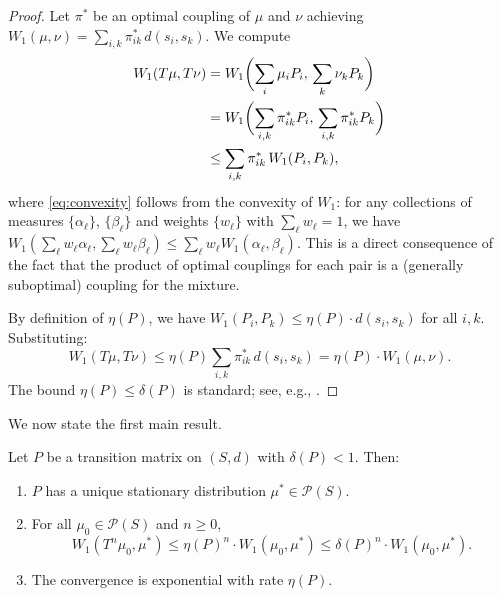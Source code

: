\begin{proof}
Let $\pi^*$ be an optimal coupling of $\mu$ and $\nu$ achieving
$W_1(\mu, \nu) = \sum_{i,k} \pi^*_{ik} \, d(s_i, s_k)$. We compute
\begin{align}
  W_1(T\mu, T\nu)
  &= W_1\biggl(\sum_i \mu_i P_i, \, \sum_k \nu_k P_k\biggr) \notag \\
  &= W_1\biggl(\sum_{i,k} \pi^*_{ik} P_i, \, \sum_{i,k} \pi^*_{ik} P_k\biggr)
    \notag \\
  &\le \sum_{i,k} \pi^*_{ik} \, W_1(P_i, P_k), \label{eq:convexity}
\end{align}
where \eqref{eq:convexity} follows from the convexity of $W_1$: for any
collections of measures $\{\alpha_\ell\}$, $\{\beta_\ell\}$ and weights
$\{w_\ell\}$ with $\sum_\ell w_\ell = 1$, we have
$W_1(\sum_\ell w_\ell \alpha_\ell, \sum_\ell w_\ell \beta_\ell)
\le \sum_\ell w_\ell W_1(\alpha_\ell, \beta_\ell)$. This is a direct
consequence of the fact that the product of optimal couplings for each pair
is a (generally suboptimal) coupling for the mixture.

By definition of $\eta(P)$, we have
$W_1(P_i, P_k) \le \eta(P) \cdot d(s_i, s_k)$ for all $i, k$. Substituting:
\begin{equation}\label{eq:contract_final}
  W_1(T\mu, T\nu) \le \eta(P) \sum_{i,k} \pi^*_{ik} \, d(s_i, s_k)
  = \eta(P) \cdot W_1(\mu, \nu).
\end{equation}
The bound $\eta(P) \le \delta(P)$ is standard; see, e.g.,
\cite{villani2009optimal}.
\end{proof}

We now state the first main result.

\begin{theorem}\label{thm:exponential}
Let $P$ be a transition matrix on $(S, d)$ with $\delta(P) < 1$. Then:
\begin{enumerate}[label=(\roman*)]
\item $P$ has a unique stationary distribution $\mu^* \in \mathcal{P}(S)$.
\item For all $\mu_0 \in \mathcal{P}(S)$ and $n \ge 0$,
  \begin{equation}\label{eq:exp_conv}
    W_1(T^n \mu_0, \mu^*) \le \eta(P)^n \cdot W_1(\mu_0, \mu^*)
    \le \delta(P)^n \cdot W_1(\mu_0, \mu^*).
  \end{equation}
\item The convergence is exponential with rate $\eta(P)$.
\end{enumerate}
\end{theorem}

